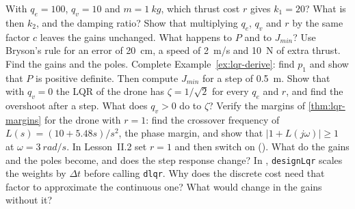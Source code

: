 \begin{exercises}
\exercise[1] With $q_e = 100$, $q_v = 10$ and $m = \SI{1}{kg}$, which thrust cost $r$ gives $k_1 = 20$? What is then $k_2$, and the damping ratio?
\exercise[1] Show that multiplying $q_e$, $q_v$ and $r$ by the same factor $c$ leaves the gains unchanged. What happens to $P$ and to $J_{min}$?
\exercise[1] Use Bryson's rule for an error of \SI{20}{cm}, a speed of \SI{2}{m/s} and \SI{10}{N} of extra thrust. Find the gains and the poles.
\exercise[2] Complete Example~\ref{ex:lqr-derive}: find $p_1$ and show that $P$ is positive definite. Then compute $J_{min}$ for a step of \SI{0.5}{m}.
\exercise[2] Show that with $q_v = 0$ the LQR of the drone has $\zeta = 1/\sqrt2$ for every $q_e$ and $r$, and find the overshoot after a step. What does $q_v > 0$ do to $\zeta$?
\exercise[2] Verify the margins of \cref{thm:lqr-margins} for the drone with $r = 1$: find the crossover frequency of $L(s) = (10 + 5.48s)/s^2$, the phase margin, and show that $|1 + L(j\omega)| \ge 1$ at $\omega = \SI{3}{rad/s}$.
\exercise[2] In Lesson~II.2 set $r = 1$ and then switch  on (). What do the gains and the poles become, and does the step response change?
\exercise[2] In , \texttt{designLqr} scales the weights by $\Delta t$ before calling \texttt{dlqr}. Why does the discrete cost need that factor to approximate the continuous one? What would change in the gains without it?

\end{exercises}
